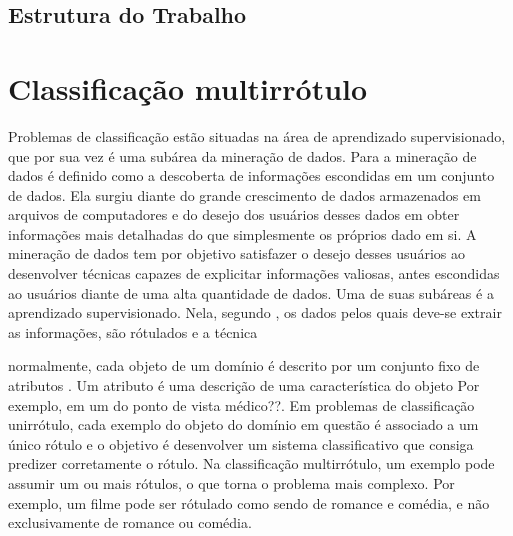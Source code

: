 \section{Estrutura do Trabalho}

\chapter{Classificação multirrótulo}

Problemas de classificação estão situadas na área de aprendizado supervisionado, que por sua vez é uma 
subárea da mineração de dados. Para \cite{dunham2003introductory} a mineração de dados é definido como a descoberta
de informações escondidas em um conjunto de dados. Ela surgiu diante do grande crescimento de dados armazenados
em arquivos de computadores e do desejo dos usuários desses dados em obter informações mais detalhadas do que simplesmente
os próprios dado em si. A mineração de dados tem por objetivo satisfazer o desejo desses usuários ao desenvolver técnicas
capazes de explicitar informações valiosas, antes escondidas ao usuários diante de uma alta quantidade de dados.
Uma de suas subáreas é a aprendizado supervisionado. Nela, segundo \cite{mohri2012foundations},
os dados pelos quais deve-se extrair as informações, são rótulados e a técnica

normalmente, cada objeto de um domínio é descrito por um conjunto fixo de atributos \cite{rezende2003sistemas}.
Um atributo é uma descrição de uma característica do objeto 
Por exemplo, em um do ponto de vista médico??.
Em problemas de classificação unirrótulo, cada exemplo do objeto do domínio em questão é associado 
a um único rótulo e o objetivo é desenvolver um sistema classificativo que consiga predizer corretamente
o rótulo. Na classificação multirrótulo, um exemplo pode assumir um ou mais rótulos, o que torna o problema mais complexo.
Por exemplo, um filme pode ser rótulado como sendo de romance e comédia, e não exclusivamente de romance ou comédia.



